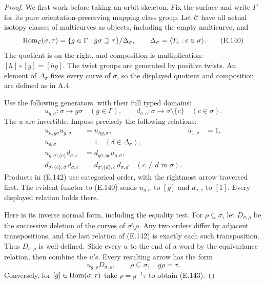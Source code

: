 \begin{proof}
We first work before taking an orbit skeleton.  Fix the surface and
write $\Gamma$ for its pure orientation-preserving mapping class
group.  Let $\mathcal C$ have all actual isotopy classes of
multicurves as objects, including the empty multicurve, and
\[
 \operatorname{Hom}_{\mathcal C}(\sigma,\tau)
 =\{g\in\Gamma:g\sigma\supseteq\tau\}/\Delta_\sigma,
 \qquad \Delta_\sigma=\langle T_c:c\in\sigma\rangle.
                                                               \tag{E.140}
\]
The quotient is on the right, and composition is multiplication:
$[h]\circ[g]=[hg]$.  The twist groups are generated by positive
twists.  An element of $\Delta_\sigma$ fixes every curve of
$\sigma$, so the displayed quotient and composition are defined
as in A.4.

Use the following generators, with their full typed domains:
\[
 u_{g,\sigma}:\sigma\longrightarrow g\sigma
       \quad(g\in\Gamma),\qquad
 d_{\sigma,c}:\sigma\longrightarrow\sigma\setminus\{c\}
       \quad(c\in\sigma).                                    \tag{E.141}
\]
The $u$ are invertible.  Impose precisely the following relations:
\[
\begin{aligned}
 u_{h,g\sigma}u_{g,\sigma}&=u_{hg,\sigma},
       &u_{1,\sigma}&=1,\\
 u_{\delta,\sigma}&=1\quad(\delta\in\Delta_\sigma),\\
 u_{g,\sigma\setminus\{c\}}d_{\sigma,c}
       &=d_{g\sigma,gc}u_{g,\sigma},\\
 d_{\sigma\setminus\{c\},d}\,d_{\sigma,c}
       &=d_{\sigma\setminus\{d\},c}\,d_{\sigma,d}
       \quad(c\ne d\text{ in }\sigma).
\end{aligned}                                                   \tag{E.142}
\]
Products in (E.142) use categorical order, with the rightmost
arrow traversed first.  The evident functor to (E.140) sends
$u_{g,\sigma}$ to $[g]$ and $d_{\sigma,c}$ to $[1]$.
Every displayed relation holds there.

Here is its inverse normal form, including the equality test.
For $\rho\subseteq\sigma$, let $D_{\sigma,\rho}$ be the
successive deletion of the curves of $\sigma\setminus\rho$.
Any two orders differ by adjacent transpositions, and the last
relation of (E.142) is exactly each such transposition.  Thus
$D_{\sigma,\rho}$ is well-defined.  Slide every $u$ to the end
of a word by the equivariance relation, then combine the $u$'s.
Every resulting arrow has the form
\[
                u_{g,\rho}D_{\sigma,\rho},
       \qquad \rho\subseteq\sigma,\quad g\rho=\tau.           \tag{E.143}
\]
Conversely, for $[g]\in\operatorname{Hom}(\sigma,\tau)$ take
$\rho=g^{-1}\tau$ to obtain (E.143).


\end{proof}
